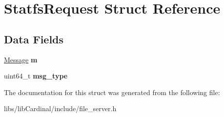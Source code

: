 \hypertarget{structStatfsRequest}{}\section{Statfs\+Request Struct Reference}
\label{structStatfsRequest}
\subsection*{Data Fields}
\begin{DoxyCompactItemize}
\item 
\hyperlink{structMessage}{Message} {\bfseries m}\hypertarget{structStatfsRequest_a93e8d106b3b34958ef7e791e5f8e8c4f}{}\label{structStatfsRequest_a93e8d106b3b34958ef7e791e5f8e8c4f}

\item 
uint64\+\_\+t {\bfseries msg\+\_\+type}\hypertarget{structStatfsRequest_afad7ce2c9341f875463cd4dd54999ee7}{}\label{structStatfsRequest_afad7ce2c9341f875463cd4dd54999ee7}

\end{DoxyCompactItemize}


The documentation for this struct was generated from the following file\+:\begin{DoxyCompactItemize}
\item 
libs/lib\+Cardinal/include/file\+\_\+server.\+h\end{DoxyCompactItemize}
